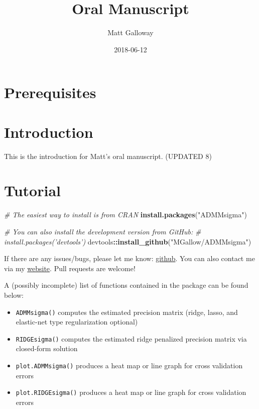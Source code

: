 \documentclass[11pt,]{book}
\title{Oral Manuscript}
\author{Matt Galloway}
\date{2018-06-12}
\newenvironment{Shaded}{\begin{snugshade}}{\end{snugshade}}
\newcommand{\CommentTok}[1]{\textcolor[rgb]{0.56,0.35,0.01}{\textit{#1}}}
\newcommand{\KeywordTok}[1]{\textcolor[rgb]{0.13,0.29,0.53}{\textbf{#1}}}
\newcommand{\NormalTok}[1]{#1}
\newcommand{\OperatorTok}[1]{\textcolor[rgb]{0.81,0.36,0.00}{\textbf{#1}}}
\newcommand{\StringTok}[1]{\textcolor[rgb]{0.31,0.60,0.02}{#1}}
\theoremstyle{definition}
\theoremstyle{definition}
\theoremstyle{definition}
\theoremstyle{remark}
\begin{document}
\maketitle

{
\hypersetup{linkcolor=}
\setcounter{tocdepth}{2}
\tableofcontents
}
\hypertarget{prerequisites}{%
\chapter{Prerequisites}\label{prerequisites}}

\hypertarget{intro}{%
\chapter{Introduction}\label{intro}}

This is the introduction for Matt's oral manuscript. (UPDATED 8)

\hypertarget{tutorial}{%
\chapter{Tutorial}\label{tutorial}}

\vspace{0.5cm}

\begin{Shaded}
\begin{Highlighting}[]
\CommentTok{# The easiest way to install is from CRAN}
\KeywordTok{install.packages}\NormalTok{(}\StringTok{"ADMMsigma"}\NormalTok{)}

\CommentTok{# You can also install the development version from GitHub:}
\CommentTok{# install.packages('devtools')}
\NormalTok{devtools}\OperatorTok{::}\KeywordTok{install_github}\NormalTok{(}\StringTok{"MGallow/ADMMsigma"}\NormalTok{)}
\end{Highlighting}
\end{Shaded}

\vspace{0.5cm}

If there are any issues/bugs, please let me know:
\href{https://github.com/MGallow/ADMMsigma/issues}{github}. You can also
contact me via my \href{https://mgallow.github.io/}{website}. Pull
requests are welcome!

\vspace{0.5cm}

A (possibly incomplete) list of functions contained in the package can
be found below:

\begin{itemize}
\item
  \texttt{ADMMsigma()} computes the estimated precision matrix (ridge,
  lasso, and elastic-net type regularization optional)
\item
  \texttt{RIDGEsigma()} computes the estimated ridge penalized precision
  matrix via closed-form solution
\item
  \texttt{plot.ADMMsigma()} produces a heat map or line graph for cross
  validation errors
\item
  \texttt{plot.RIDGEsigma()} produces a heat map or line graph for cross
  validation errors
\end{itemize}
\end{document}
